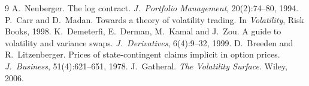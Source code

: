 \documentclass[11pt]{article}
\begin{document}
\begin{thebibliography}{9}
 A.~Neuberger.  The log contract.
\emph{J.\ Portfolio Management}, 20(2):74--80, 1994.
 P.~Carr and D.~Madan.  Towards a theory of
volatility trading.  In \emph{Volatility}, Risk Books, 1998.
 K.~Demeterfi, E.~Derman, M.~Kamal
and J.~Zou.  A guide to volatility and variance swaps.
\emph{J.\ Derivatives}, 6(4):9--32, 1999.
 D.~Breeden and R.~Litzenberger.
Prices of state-contingent claims implicit in option prices.
\emph{J.\ Business}, 51(4):621--651, 1978.
 J.~Gatheral.  \emph{The Volatility Surface}.
Wiley, 2006.
\end{thebibliography}
\end{document}
